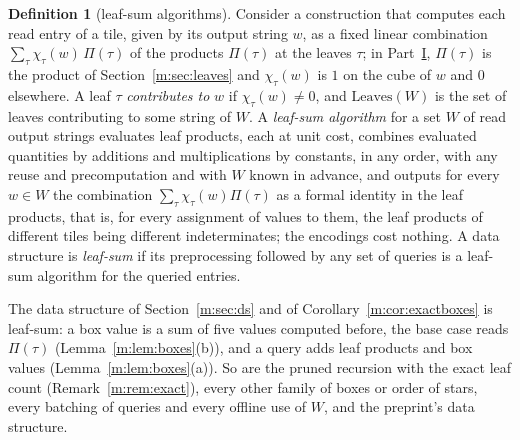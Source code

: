 \documentclass[11pt]{article}
\theoremstyle{definition}
\newtheorem{definition}[theorem]{Definition}
\theoremstyle{remark}
\newcommand{\Leaves}{\mathrm{Leaves}}
\begin{document}
\begin{definition}[leaf-sum algorithms]\label{m:def:leafsum}
Consider a construction that computes each read entry of a tile, given by its output string $w$, as a fixed linear combination $\sum_\tau\chi_\tau(w)\,\Pi(\tau)$ of the products $\Pi(\tau)$ at the leaves $\tau$; in Part~\hyperref[m:partI]{I}, $\Pi(\tau)$ is the product of Section~\ref{m:sec:leaves} and $\chi_\tau(w)$ is $1$ on the cube of $w$ and $0$ elsewhere. A leaf $\tau$ \emph{contributes to} $w$ if $\chi_\tau(w)\ne0$, and $\Leaves(W)$ is the set of leaves contributing to some string of $W$. A \emph{leaf-sum algorithm} for a set $W$ of read output strings evaluates leaf products, each at unit cost, combines evaluated quantities by additions and multiplications by constants, in any order, with any reuse and precomputation and with $W$ known in advance, and outputs for every $w\in W$ the combination $\sum_\tau\chi_\tau(w)\Pi(\tau)$ as a formal identity in the leaf products, that is, for every assignment of values to them, the leaf products of different tiles being different indeterminates; the encodings cost nothing. A data structure is \emph{leaf-sum} if its preprocessing followed by any set of queries is a leaf-sum algorithm for the queried entries.
\end{definition}

The data structure of Section~\ref{m:sec:ds} and of Corollary~\ref{m:cor:exactboxes} is leaf-sum: a box value is a sum of five values computed before, the base case reads $\Pi(\tau)$ (Lemma~\ref{m:lem:boxes}(b)), and a query adds leaf products and box values (Lemma~\ref{m:lem:boxes}(a)). So are the pruned recursion with the exact leaf count (Remark~\ref{m:rem:exact}), every other family of boxes or order of stars, every batching of queries and every offline use of $W$, and the preprint's data structure.
\end{document}
